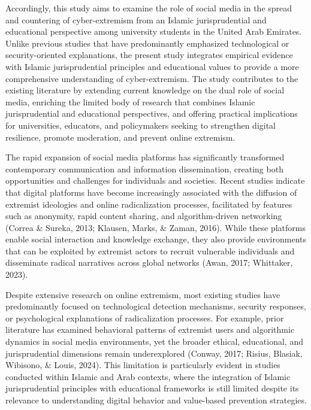 \documentclass[10pt]{NSP1}
\begin{document}
Accordingly, this study aims to examine the role of social media in the spread and countering of cyber-extremism from an Islamic jurisprudential and educational perspective among university students in the United Arab Emirates. Unlike previous studies that have predominantly emphasized technological or security-oriented explanations, the present study integrates empirical evidence with Islamic jurisprudential principles and educational values to provide a more comprehensive understanding of cyber-extremism. The study contributes to the existing literature by extending current knowledge on the dual role of social media, enriching the limited body of research that combines Islamic jurisprudential and educational perspectives, and offering practical implications for universities, educators, and policymakers seeking to strengthen digital resilience, promote moderation, and prevent online extremism.

\par\medskip{}\smallskip

The rapid expansion of social media platforms has significantly transformed contemporary communication and information dissemination, creating both opportunities and challenges for individuals and societies. Recent studies indicate that digital platforms have become increasingly associated with the diffusion of extremist ideologies and online radicalization processes, facilitated by features such as anonymity, rapid content sharing, and algorithm-driven networking (Correa \& Sureka, 2013; Klausen, Marks, \& Zaman, 2016). While these platforms enable social interaction and knowledge exchange, they also provide environments that can be exploited by extremist actors to recruit vulnerable individuals and disseminate radical narratives across global networks (Awan, 2017; Whittaker, 2023).

Despite extensive research on online extremism, most existing studies have predominantly focused on technological detection mechanisms, security responses, or psychological explanations of radicalization processes. For example, prior literature has examined behavioral patterns of extremist users and algorithmic dynamics in social media environments, yet the broader ethical, educational, and jurisprudential dimensions remain underexplored (Conway, 2017; Risius, Blasiak, Wibisono, \& Louis, 2024). This limitation is particularly evident in studies conducted within Islamic and Arab contexts, where the integration of Islamic jurisprudential principles with educational frameworks is still limited despite its relevance to understanding digital behavior and value-based prevention strategies.
\end{document}
